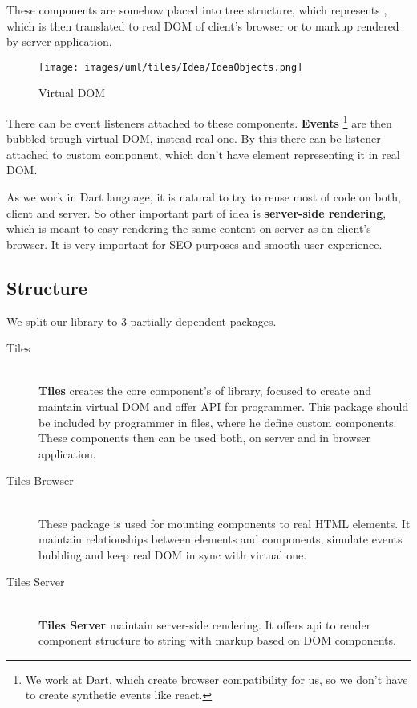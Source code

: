     These components are somehow placed into tree structure, which represents \mbox{\textbf{}}, 
    which is then translated to real DOM of client's browser or to markup rendered by server application.

    \begin{figure}[h]
    \centering  
      \texttt{[image: images/uml/tiles/Idea/IdeaObjects.png]}
      \caption{Virtual DOM}
      \label{img:library-idea-virtual-dom}
    \end{figure}
    There can be event listeners attached to these components. 
    \textbf{Events} \footnote{We work at Dart, which create browser compatibility for us, so we don't have to create synthetic events like react.}
    are then bubbled trough virtual DOM, instead real one.
    By this there can be listener attached to custom component, which don't have element representing it in real DOM.

    As we work in Dart language, it is natural to try to reuse most of code on both, client and server.
    So other important part of idea is \textbf{server-side rendering}, 
    which is meant to easy rendering the same content on server as on client's browser.
    It is very important for SEO purposes and smooth user experience. 

  \subsection{Structure}\label{subsec:our-architecture-structure}

    We split our library to 3 partially dependent packages. 
    \begin{description}
      \item[Tiles] \hfill \\
        \textbf{Tiles} creates the core component's of library, focused to create and maintain virtual DOM and offer API for programmer.
        This package should be included by programmer in files, where he define custom components. 
        These components then can be used both, on server and in browser application.
      \item[Tiles Browser] \hfill \\
        These package is used for mounting components to real HTML elements. 
        It maintain relationships between elements and components, 
        simulate events bubbling and keep real DOM in sync with virtual one.
      \item[Tiles Server] \hfill \\
        \textbf{Tiles Server} maintain server-side rendering. It offers api to render component structure to string with markup based on DOM components.
    \end{description}

